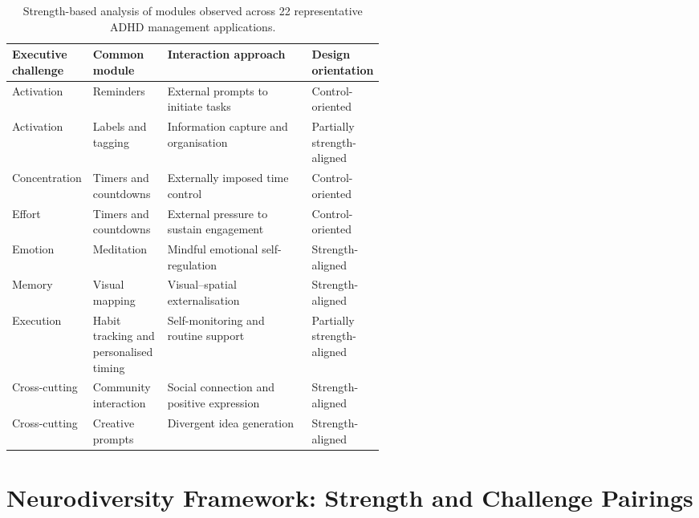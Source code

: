 \documentclass[manuscript,screen,review,anonymous]{acmart}
\begin{document}
\begin{table}[htbp]
\centering
\caption{Strength-based analysis of modules observed across 22 representative
ADHD management applications.}
\label{tab:apps}

\footnotesize
\renewcommand{\arraystretch}{1.12}
\setlength{\tabcolsep}{3pt}

\begin{tabularx}{\linewidth}{
    @{}
    >{\raggedright\arraybackslash}p{0.15\linewidth}
    >{\raggedright\arraybackslash}p{0.20\linewidth}
    Y
    >{\raggedright\arraybackslash}p{0.19\linewidth}
    @{}
}
\toprule
\textbf{Executive challenge} &
\textbf{Common module} &
\textbf{Interaction approach} &
\textbf{Design orientation} \\
\midrule

Activation &
Reminders &
External prompts to initiate tasks &
Control-oriented \\

Activation &
Labels and tagging &
Information capture and organisation &
Partially strength-aligned \\

Concentration &
Timers and countdowns &
Externally imposed time control &
Control-oriented \\

Effort &
Timers and countdowns &
External pressure to sustain engagement &
Control-oriented \\

Emotion &
Meditation &
Mindful emotional self-regulation &
Strength-aligned \\

Memory &
Visual mapping &
Visual--spatial externalisation &
Strength-aligned \\

Execution &
Habit tracking and personalised timing &
Self-monitoring and routine support &
Partially strength-aligned \\

Cross-cutting &
Community interaction &
Social connection and positive expression &
Strength-aligned \\

Cross-cutting &
Creative prompts &
Divergent idea generation &
Strength-aligned \\

\bottomrule
\end{tabularx}
\end{table}



\section{Neurodiversity Framework: Strength and Challenge Pairings}
\end{document}
